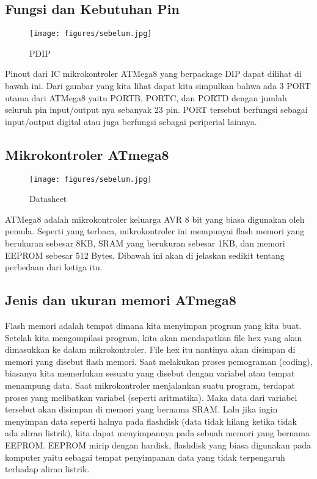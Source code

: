 	\subsection{Fungsi dan Kebutuhan Pin}
	
		\begin{figure}[ht]
			\centerline{\texttt{[image: figures/sebelum.jpg]}}
			\caption{PDIP}
			\label{pdip}
			\end{figure}
			
		Pinout dari IC mikrokontroler ATMega8 yang berpackage DIP dapat dilihat di bawah ini.
		Dari gambar yang kita lihat dapat kita simpulkan bahwa ada 3 PORT utama dari ATMega8 yaitu PORTB, PORTC, dan PORTD dengan jumlah seluruh pin input/output nya sebanyak 23 pin. PORT tersebut berfungsi sebagai input/output digital atau juga berfungsi sebagai periperial lainnya.
		
	\subsection{Mikrokontroler ATmega8}
	
		\begin{figure}[ht]
			\centerline{\texttt{[image: figures/sebelum.jpg]}}
			\caption{Datasheet}
			\label{datamemori}
			\end{figure}
			
		ATMega8 adalah mikrokontroler keluarga AVR 8 bit yang biasa digunakan oleh pemula. Seperti yang terbaca, mikrokontroler ini mempunyai flash memori yang berukuran sebesar 8KB, SRAM yang berukuran sebesar 1KB, dan memori EEPROM sebesar 512 Bytes. Dibawah ini akan di jelaskan sedikit tentang perbedaan dari ketiga itu.
	\subsection{Jenis dan ukuran memori ATmega8}
		Flash memori adalah tempat dimana kita  menyimpan program yang kita buat. Setelah kita mengompilasi program, kita akan mendapatkan file hex yang akan dimasukkan ke dalam  mikrokontroler. File hex itu nantinya akan disimpan di memori yang disebut flash memori. Saat melakukan proses pemograman (coding), biasanya kita memerlukan sesuatu yang disebut dengan variabel atau tempat menampung data.
		Saat mikrokontroler menjalankan suatu program, terdapat proses yang melibatkan variabel (seperti aritmatika). Maka data dari variabel tersebut akan disimpan di memori yang bernama SRAM. Lalu jika ingin menyimpan data seperti halnya pada flashdisk (data tidak hilang ketika tidak ada aliran listrik), kita dapat menyimpannya pada sebuah memori yang bernama EEPROM. EEPROM mirip dengan hardisk, flashdisk yang biasa digunakan pada komputer yaitu sebagai tempat penyimpanan data yang tidak terpengaruh terhadap aliran listrik.

